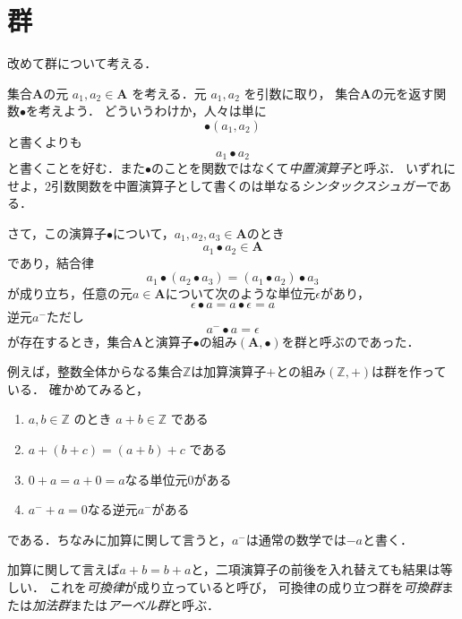 \documentclass{jsbook}
\newcommand{\keyword}[1]{\emph{#1}}
\newcommand{\bg}[1]{\mathbf{#1}}
\begin{document}
\section{群}

改めて群について考える．

集合$\bg{A}$の元 $a_1,a_2\in\bg{A}$ を考える．元 $a_1,a_2$ を引数に取り，
集合$\bg{A}$の元を返す関数$\bullet$を考えよう．
どういうわけか，人々は単に
\begin{equation}
\bullet(a_1,a_2)
\end{equation}
と書くよりも
\begin{equation}
a_1\bullet a_2
\end{equation}
と書くことを好む．また$\bullet$のことを関数ではなくて\keyword{中置演算子}と呼ぶ．
いずれにせよ，2引数関数を中置演算子として書くのは単なる\keyword{シンタックスシュガー}である．

さて，この演算子$\bullet$について，$a_1,a_2,a_3\in\bg{A}$のとき
\begin{equation}
a_1\bullet a_2\in\bg{A}
\end{equation}
であり，結合律
\begin{equation}
a_1\bullet(a_2\bullet a_3)=(a_1\bullet a_2)\bullet a_3
\end{equation}
が成り立ち，任意の元$a\in\bg{A}$について次のような単位元$\epsilon$があり，
\begin{equation}
\epsilon\bullet a=a\bullet\epsilon=a
\end{equation}
逆元$a^-$ただし
\begin{equation}
a^-\bullet a=\epsilon
\end{equation}
が存在するとき，集合$\bg{A}$と演算子$\bullet$の組み$(\bg{A},\bullet)$を群と呼ぶのであった．

例えば，整数全体からなる集合$\mathbb{Z}$は加算演算子$+$との組み$(\mathbb{Z},+)$は群を作っている．
確かめてみると，
\begin{enumerate}
\item $a,b\in\mathbb{Z}$ のとき $a+b\in\mathbb{Z}$ である
\item $a+(b+c)=(a+b)+c$ である
\item $0+a=a+0=a$なる単位元$0$がある
\item $a^{-}+a=0$なる逆元$a^{-}$がある
\end{enumerate}
である．ちなみに加算に関して言うと，$a^{-}$は通常の数学では$-a$と書く．

加算に関して言えば$a+b=b+a$と，二項演算子の前後を入れ替えても結果は等しい．
これを\keyword{可換律}が成り立っていると呼び，
可換律の成り立つ群を\keyword{可換群}または\keyword{加法群}または\keyword{アーベル群}と呼ぶ．
\end{document}
